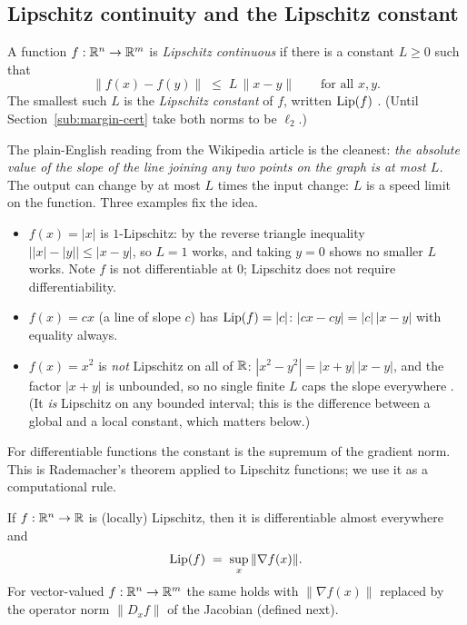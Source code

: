 \subsection{Lipschitz continuity and the Lipschitz constant}
\label{sub:lip-def}

\begin{definition}
A function $f:\mathbb{R}^n\to\mathbb{R}^m$ is \emph{Lipschitz continuous} if there is a constant $L\ge0$ such that
\[
  \|f(x)-f(y)\| \;\le\; L\,\|x-y\| \qquad \text{for all } x,y .
\]
The smallest such $L$ is the \emph{Lipschitz constant} of $f$, written $\operatorname{Lip}(f)$ \citep{scaman2018lipschitz}. (Until Section~\ref{sub:margin-cert} take both norms to be $\ell_2$.)
\end{definition}

The plain-English reading from the Wikipedia article \citep{wiki_lipschitz} is the cleanest: \emph{the absolute value of the slope of the line joining any two points on the graph is at most $L$.} The output can change by at most $L$ times the input change: $L$ is a speed limit on the function. Three examples fix the idea.

\begin{example}\leavevmode
\begin{itemize}[nosep]
  \item $f(x)=|x|$ is $1$-Lipschitz: by the reverse triangle inequality $\big||x|-|y|\big|\le|x-y|$, so $L=1$ works, and taking $y=0$ shows no smaller $L$ works. Note $f$ is not differentiable at $0$; Lipschitz does not require differentiability.
  \item $f(x)=cx$ (a line of slope $c$) has $\operatorname{Lip}(f)=|c|$: $|cx-cy|=|c|\,|x-y|$ with equality always.
  \item $f(x)=x^2$ is \emph{not} Lipschitz on all of $\mathbb{R}$: $|x^2-y^2|=|x+y|\,|x-y|$, and the factor $|x+y|$ is unbounded, so no single finite $L$ caps the slope everywhere \citep{wiki_lipschitz}. (It \emph{is} Lipschitz on any bounded interval; this is the difference between a global and a local constant, which matters below.)
\end{itemize}
\end{example}

For differentiable functions the constant is the supremum of the gradient norm. This is Rademacher's theorem applied to Lipschitz functions; we use it as a computational rule.

\begin{theorem}
\label{thm:lip-grad}
If $f:\mathbb{R}^n\to\mathbb{R}$ is (locally) Lipschitz, then it is differentiable almost everywhere and
\[
  \operatorname{Lip}(f) \;=\; \sup_{x} \|\nabla f(x)\| .
\]
For vector-valued $f:\mathbb{R}^n\to\mathbb{R}^m$ the same holds with $\|\nabla f(x)\|$ replaced by the operator norm $\|D_x f\|$ of the Jacobian (defined next).
\end{theorem}

